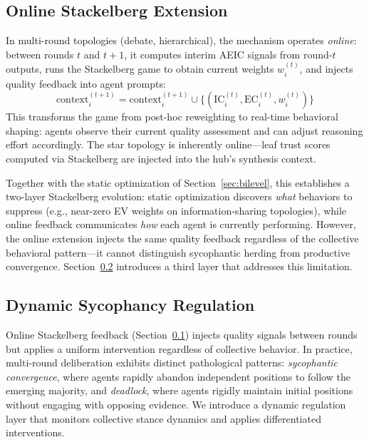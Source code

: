 \subsection{Online Stackelberg Extension}
\label{sec:online_sg}

In multi-round topologies (debate, hierarchical), the mechanism operates \emph{online}: between rounds $t$ and $t{+}1$, it computes interim AEIC signals from round-$t$ outputs, runs the Stackelberg game to obtain current weights $w_i^{(t)}$, and injects quality feedback into agent prompts:
\begin{equation}
    \text{context}_i^{(t+1)} = \text{context}_i^{(t+1)} \cup \{(\text{IC}_i^{(t)}, \text{EC}_i^{(t)}, w_i^{(t)})\}
\end{equation}
This transforms the game from post-hoc reweighting to real-time behavioral shaping: agents observe their current quality assessment and can adjust reasoning effort accordingly. The star topology is inherently online---leaf trust scores computed via Stackelberg are injected into the hub's synthesis context.

Together with the static optimization of Section~\ref{sec:bilevel}, this establishes a two-layer Stackelberg evolution: static optimization discovers \emph{what} behaviors to suppress (e.g., near-zero EV weights on information-sharing topologies), while online feedback communicates \emph{how} each agent is currently performing. However, the online extension injects the same quality feedback regardless of the collective behavioral pattern---it cannot distinguish sycophantic herding from productive convergence. Section~\ref{sec:dynamic} introduces a third layer that addresses this limitation.

\subsection{Dynamic Sycophancy Regulation}
\label{sec:dynamic}

Online Stackelberg feedback (Section~\ref{sec:online_sg}) injects quality signals between rounds but applies a uniform intervention regardless of collective behavior. In practice, multi-round deliberation exhibits distinct pathological patterns: \emph{sycophantic convergence}, where agents rapidly abandon independent positions to follow the emerging majority, and \emph{deadlock}, where agents rigidly maintain initial positions without engaging with opposing evidence. We introduce a dynamic regulation layer that monitors collective stance dynamics and applies differentiated interventions.

